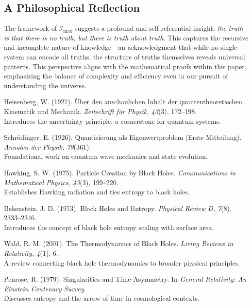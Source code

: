 \documentclass[12pt]{article}
\begin{document}
\subsection*{A Philosophical Reflection}

The framework of \(\mathcal{I}_{\text{max}}\) suggests a profound and self-referential insight: \textit{the truth is that there is no truth, but there is truth about truth.} This captures the recursive and incomplete nature of knowledge—an acknowledgment that while no single system can encode all truths, the structure of truths themselves reveals universal patterns. This perspective aligns with the mathematical proofs within this paper, emphasizing the balance of complexity and efficiency even in our pursuit of understanding the universe.


\begin{thebibliography}{99}

Heisenberg, W. (1927). Über den anschaulichen Inhalt der quantentheoretischen Kinematik und Mechanik. \textit{Zeitschrift für Physik, 43}(3), 172–198. \\
Introduces the uncertainty principle, a cornerstone for quantum systems.

Schrödinger, E. (1926). Quantisierung als Eigenwertproblem (Erste Mitteilung). \textit{Annalen der Physik, 79}(361). \\
Foundational work on quantum wave mechanics and state evolution.

Hawking, S. W. (1975). Particle Creation by Black Holes. \textit{Communications in Mathematical Physics, 43}(3), 199–220. \\
Establishes Hawking radiation and ties entropy to black holes.

Bekenstein, J. D. (1973). Black Holes and Entropy. \textit{Physical Review D, 7}(8), 2333–2346. \\
Introduces the concept of black hole entropy scaling with surface area.

Wald, R. M. (2001). The Thermodynamics of Black Holes. \textit{Living Reviews in Relativity, 4}(1), 6. \\
A review connecting black hole thermodynamics to broader physical principles.

Penrose, R. (1979). Singularities and Time-Asymmetry. In \textit{General Relativity: An Einstein Centenary Survey}. \\
Discusses entropy and the arrow of time in cosmological contexts.


\end{thebibliography}
\end{document}
